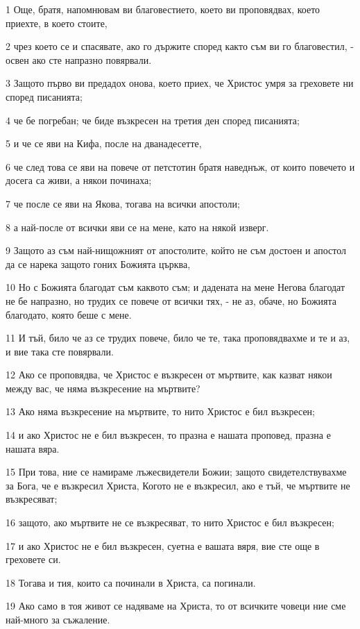 \par 1 Още, братя, напомнювам ви благовестието, което ви проповядвах, което приехте, в което стоите,
\par 2 чрез което се и спасявате, ако го държите според както съм ви го благовестил, - освен ако сте напразно повярвали.
\par 3 Защото първо ви предадох онова, което приех, че Христос умря за греховете ни според писанията;
\par 4 че бе погребан; че биде възкресен на третия ден според писанията;
\par 5 и че се яви на Кифа, после на дванадесетте,
\par 6 че след това се яви на повече от петстотин братя наведнъж, от които повечето и досега са живи, а някои починаха;
\par 7 че после се яви на Якова, тогава на всички апостоли;
\par 8 а най-после от всички яви се на мене, като на някой изверг.
\par 9 Защото аз съм най-нищожният от апостолите, който не съм достоен и апостол да се нарека защото гоних Божията църква,
\par 10 Но с Божията благодат съм каквото съм; и дадената на мене Негова благодат не бе напразно, но трудих се повече от всички тях, - не аз, обаче, но Божията благодато, която беше с мене.
\par 11 И тъй, било че аз се трудих повече, било че те, така проповядвахме и те и аз, и вие така сте повярвали.
\par 12 Ако се проповядва, че Христос е възкресен от мъртвите, как казват някои между вас, че няма възкресение на мъртвите?
\par 13 Ако няма възкресение на мъртвите, то нито Христос е бил възкресен;
\par 14 и ако Христос не е бил възкресен, то празна е нашата проповед, празна е нашата вяра.
\par 15 При това, ние се намираме лъжесвидетели Божии; защото свидетелствувахме за Бога, че е възкресил Христа, Когото не е възкресил, ако е тъй, че мъртвите не възкресяват;
\par 16 защото, ако мъртвите не се възкресяват, то нито Христос е бил възкресен;
\par 17 и ако Христос не е бил възкресен, суетна е вашата вяря, вие сте още в греховете си.
\par 18 Тогава и тия, които са починали в Христа, са погинали.
\par 19 Ако само в тоя живот се надяваме на Христа, то от всичките човеци ние сме най-много за съжаление.
